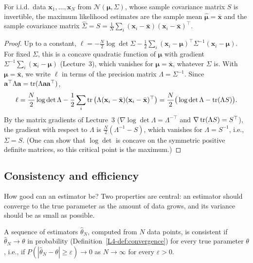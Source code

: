 \begin{theorem}\label{L4-thm:mle-mvn}
    For i.i.d.\ data $\mathbf{x}_1, \ldots, \mathbf{x}_N$ from $\mathcal{N}(\boldsymbol{\mu}, \Sigma)$, whose sample covariance matrix $S$ is invertible, the maximum likelihood estimates are the sample mean $\hat{\boldsymbol{\mu}} = \bar{\mathbf{x}}$ and the sample covariance matrix $\hat\Sigma = S = \frac{1}{N}\sum_i (\mathbf{x}_i - \bar{\mathbf{x}})(\mathbf{x}_i - \bar{\mathbf{x}})^\top$.
\end{theorem}

\begin{proof}
    Up to a constant, $\ell = -\frac{N}{2}\log\det\Sigma - \frac{1}{2}\sum_i (\mathbf{x}_i - \boldsymbol{\mu})^\top\Sigma^{-1}(\mathbf{x}_i - \boldsymbol{\mu})$. For fixed $\Sigma$, this is a concave quadratic function of $\boldsymbol{\mu}$ with gradient $\Sigma^{-1}\sum_i (\mathbf{x}_i - \boldsymbol{\mu})$ (Lecture~3), which vanishes for $\boldsymbol{\mu} = \bar{\mathbf{x}}$, whatever $\Sigma$ is. With $\boldsymbol{\mu} = \bar{\mathbf{x}}$, we write $\ell$ in terms of the precision matrix $\Lambda = \Sigma^{-1}$. Since $\mathbf{a}^\top\Lambda\mathbf{a} = \operatorname{tr}(\Lambda\mathbf{a}\mathbf{a}^\top)$,
    \[\ell = \frac{N}{2}\log\det\Lambda - \frac{1}{2}\sum_i \operatorname{tr}\big(\Lambda(\mathbf{x}_i - \bar{\mathbf{x}})(\mathbf{x}_i - \bar{\mathbf{x}})^\top\big) = \frac{N}{2}\big(\log\det\Lambda - \operatorname{tr}(\Lambda S)\big).\]
    By the matrix gradients of Lecture~3 ($\nabla\log\det\Lambda = \Lambda^{-\top}$ and $\nabla\operatorname{tr}(\Lambda S) = S^\top$), the gradient with respect to $\Lambda$ is $\frac{N}{2}(\Lambda^{-1} - S)$, which vanishes for $\Lambda = S^{-1}$, i.e., $\Sigma = S$. (One can show that $\log\det$ is concave on the symmetric positive definite matrices, so this critical point is the maximum.)
\end{proof}

\subsection{Consistency and efficiency}

How good can an estimator be? Two properties are central: an estimator should converge to the true parameter as the amount of data grows, and its variance should be as small as possible.

\begin{definition}[Consistency]\label{L4-def:consistent}
    A sequence of estimators $\hat\theta_N$, computed from $N$ data points, is consistent if $\hat\theta_N \to \theta$ in probability (Definition~\ref{L4-def:convergence}) for every true parameter $\theta$, i.e., if $P(|\hat\theta_N - \theta| \geq \varepsilon) \to 0$ as $N \to \infty$ for every $\varepsilon > 0$.
\end{definition}

